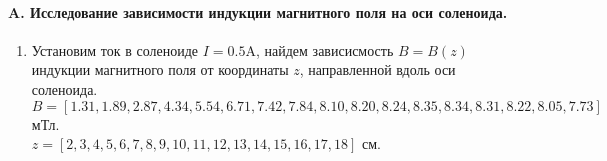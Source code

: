 \documentclass[10pt]{article}
\begin{document}
\paragraph{\large {A. Исследование зависимости индукции магнитного поля на оси соленоида.\\}} 
    \begin{enumerate}
    \item 
        Установим ток в соленоиде $I = 0.5$A, найдем зависисмость $B = B(z)$ индукции магнитного поля от координаты $z$, направленной вдоль оси соленоида.\\
        $B = [1.31, 1.89,2.87,4.34,5.54,6.71,7.42,7.84,8.10,8.20,8.24,8.35,8.34,8.31,8.22,8.05,7.73]$ мТл. \\
        $z = [2, 3, 4, 5, 6, 7, 8, 9, 10, 11, 12, 13, 14, 15, 16, 17, 18]$ см. \\


\end{enumerate}
\end{document}
